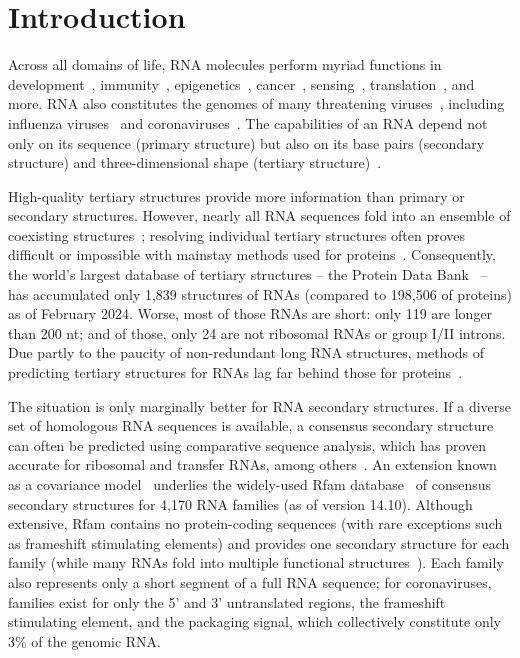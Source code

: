 \documentclass[main.tex]{subfiles}
\begin{document}
\section{Introduction}

Across all domains of life, RNA molecules perform myriad functions in development~\cite{Klattenhoff2013}, immunity~\cite{Wiedenheft2012}, epigenetics~\cite{Bhan2015}, cancer~\cite{Hajjari2015}, sensing~\cite{Kortmann2012,Serganov2013}, translation~\cite{Noller2012}, and more.
RNA also constitutes the genomes of many threatening viruses~\cite{Woolhouse2018}, including influenza viruses~\cite{Bouvier2008} and coronaviruses~\cite{Yang2015a}.
The capabilities of an RNA depend not only on its sequence (primary structure) but also on its base pairs (secondary structure) and three-dimensional shape (tertiary structure)~\cite{Mortimer2014}.

High-quality tertiary structures provide more information than primary or secondary structures.
However, nearly all RNA sequences fold into an ensemble of coexisting structures~\cite{Mustoe2014,Spitale2023}; resolving individual tertiary structures often proves difficult or impossible with mainstay methods used for proteins~\cite{Kappel2020}.
Consequently, the world's largest database of tertiary structures -- the Protein Data Bank~\cite{Berman2000} -- has accumulated only 1,839 structures of RNAs (compared to 198,506 of proteins) as of February 2024.
Worse, most of those RNAs are short: only 119 are longer than 200 nt; and of those, only 24 are not ribosomal RNAs or group I/II introns.
Due partly to the paucity of non-redundant long RNA structures, methods of predicting tertiary structures for RNAs lag far behind those for proteins~\cite{Schneider2023}.

The situation is only marginally better for RNA secondary structures.
If a diverse set of homologous RNA sequences is available, a consensus secondary structure can often be predicted using comparative sequence analysis, which has proven accurate for ribosomal and transfer RNAs, among others~\cite{Cannone2002}.
An extension known as a covariance model~\cite{Eddy1994} underlies the widely-used Rfam database~\cite{Kalvari2020} of consensus secondary structures for 4,170 RNA families (as of version 14.10).
Although extensive, Rfam contains no protein-coding sequences (with rare exceptions such as frameshift stimulating elements) and provides one secondary structure for each family (while many RNAs fold into multiple functional structures~\cite{Spitale2023}).
Each family also represents only a short segment of a full RNA sequence; for coronaviruses, families exist for only the 5' and 3' untranslated regions, the frameshift stimulating element, and the packaging signal, which collectively constitute only 3\% of the genomic RNA.
\end{document}
